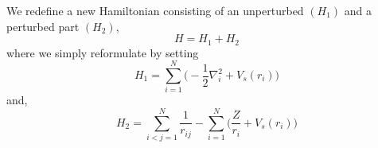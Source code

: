 %
%

We redefine a new Hamiltonian consisting of an unperturbed $(H_1)$ and a perturbed part $(H_2)$,
	\begin{equation}\label{eq:many_hampert}
	H=H_1+H_2
	\end{equation}
where we simply reformulate by setting
\begin{equation}\label{eq:many_cfham}
 H_1 = \sum_{i=1}^N \Big(-\frac{1}{2}\nabla_i^2+ V_s(r_i)\Big)
\end{equation}
and,
\begin{equation}\label{eq:many_H2}
H_2 = \sum_{i<j=1}^N \frac{1}{r_{ij}} -\sum_{i=1}^N\Big( \frac{Z}{r_i} + V_s(r_i)\Big)
\end{equation}


